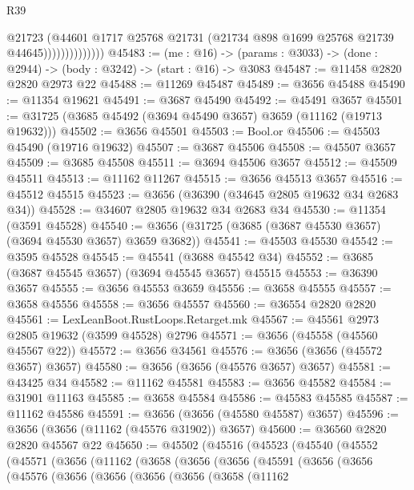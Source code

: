 \begin{lexlean}{R39}
\begin{coremodule}
                            @21723
                            (@44601
                              @1717
                              @25768
                              @21731
                              (@21734 @898 @1699 @25768 @21739 @44645))))))))))))))
@45483 := (me : @16) ->
  (params : @3033) -> (done : @2944) -> (body : @3242) -> (start : @16) -> @3083
@45487 := @11458 @2820 @2820 @2973 @22
@45488 := @11269 @45487
@45489 := @3656 @45488
@45490 := @11354 @19621
@45491 := @3687 @45490
@45492 := @45491 @3657
@45501 := @31725 (@3685 @45492 (@3694 @45490 @3657) @3659 (@11162 (@19713 @19632)))
@45502 := @3656 @45501
@45503 := Bool.or
@45506 := @45503 @45490 (@19716 @19632)
@45507 := @3687 @45506
@45508 := @45507 @3657
@45509 := @3685 @45508
@45511 := @3694 @45506 @3657
@45512 := @45509 @45511
@45513 := @11162 @11267
@45515 := @3656 @45513 @3657
@45516 := @45512 @45515
@45523 := @3656 (@36390 (@34645 @2805 @19632 @34 @2683 @34))
@45528 := @34607 @2805 @19632 @34 @2683 @34
@45530 := @11354 (@3591 @45528)
@45540 := @3656 (@31725 (@3685 (@3687 @45530 @3657) (@3694 @45530 @3657) @3659 @3682))
@45541 := @45503 @45530
@45542 := @3595 @45528
@45545 := @45541 (@3688 @45542 @34)
@45552 := @3685 (@3687 @45545 @3657) (@3694 @45545 @3657) @45515
@45553 := @36390 @3657
@45555 := @3656 @45553 @3659
@45556 := @3658 @45555
@45557 := @3658 @45556
@45558 := @3656 @45557
@45560 := @36554 @2820 @2820
@45561 := LexLeanBoot.RustLoops.Retarget.mk
@45567 := @45561 @2973 @2805 @19632 (@3599 @45528) @2796
@45571 := @3656 (@45558 (@45560 @45567 @22))
@45572 := @3656 @34561
@45576 := @3656 (@3656 (@45572 @3657) @3657)
@45580 := @3656 (@3656 (@45576 @3657) @3657)
@45581 := @43425 @34
@45582 := @11162 @45581
@45583 := @3656 @45582
@45584 := @31901 @11163
@45585 := @3658 @45584
@45586 := @45583 @45585
@45587 := @11162 @45586
@45591 := @3656 (@3656 (@45580 @45587) @3657)
@45596 := @3656 (@3656 (@11162 (@45576 @31902)) @3657)
@45600 := @36560 @2820 @2820 @45567 @22
@45650 := @45502
    (@45516
      (@45523
        (@45540
          (@45552
            (@45571
              (@3656
                (@11162
                  (@3658
                    (@3656
                      (@3656
                        (@45591
                          (@3656
                            (@3656
                              (@45576
                                (@3656
                                  (@3656
                                    (@3656
                                      (@3656
                                        (@3658
                                          (@11162

\end{coremodule}
\end{lexlean}

